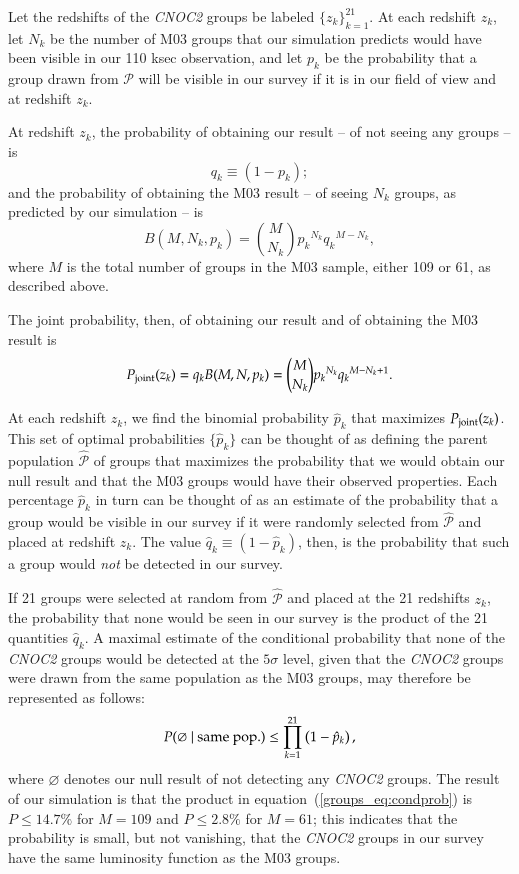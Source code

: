 Let the redshifts of the \textsl{CNOC2} groups be labeled $\{z_k\}_{k=1}^{21}$.
At each redshift $z_k$, let $N_k$ be the number of M03 groups that our
simulation predicts would have been visible in our 110 ksec observation, and
let $p_k$ be the probability that a group drawn from $\mathcal{P}$ will be
visible in our survey if it is in our field of view and at redshift $z_k$.

At redshift $z_k$, the probability of obtaining our result -- of not seeing any
groups -- is
\begin{equation}
q_k \equiv (1-p_k);
\label{groups_eq:qk}
\end{equation}
and the probability of obtaining the M03 result -- of seeing $N_k$ groups, as
predicted by our simulation -- is
\begin{equation}
B(M,N_k,p_k) = {M \choose N_k} {p_k}^{N_k} {q_k}^{M-N_k},
\label{groups_eq:M03prob}
\end{equation}
where $M$ is the total number of groups in the M03 sample, either 109 or 61, as
described above.

The joint probability, then, of obtaining our result and of obtaining the M03
result is
\begin{equation}
P_{\rm joint}(z_k) = q_k B(M,N,p_k) = {M \choose N_k} {p_k}^{N_k} {q_k}^{M-N_k+1}.
\label{groups_eq:joint}
\end{equation}

At each redshift $z_k$, we find the binomial probability $\hat{p}_k$ that
maximizes $P_{\rm joint}(z_k)$.  This set of optimal probabilities
$\{ \hat{p}_k \}$ can be thought of as defining the parent population
$\widehat{\mathcal{P}}$ of groups that maximizes the probability that we would
obtain our null result and that the M03 groups would have their observed
properties.  Each percentage $\hat{p}_k$ in turn can be thought of as an
estimate of the probability that a group would be visible in our survey if it
were randomly selected from $\widehat{\mathcal{P}}$ and placed at redshift
$z_k$.  The value $\hat{q}_k \equiv (1-\hat{p}_k)$, then, is the
probability that such a group would {\it not} be detected in our survey.

If 21 groups were selected at random from $\widehat{\mathcal{P}}$ and placed at
the 21 redshifts $z_k$,
the probability that none would be seen in our survey is the product
of the 21 quantities $\hat{q}_k$.  A maximal estimate of the conditional
probability that none of the \textsl{CNOC2} groups would be detected at the
$5\sigma$ level, given that the \textsl{CNOC2} groups were drawn from the same
population as the M03 groups, may therefore be represented as follows:
\begin{equation}
P(\varnothing ~| {\rm ~same ~pop.}) \leq \prod_{k=1}^{21} \left( 1-\hat{p}_k \right),
\label{groups_eq:condprob}
\end{equation}
where $\varnothing$ denotes our null result of not detecting any
\textsl{CNOC2} groups.  The result of our simulation is that the
product in equation~(\ref{groups_eq:condprob}) is $P \leq 14.7\%$ for
$M=109$ and $P \leq 2.8\%$ for $M=61$; this indicates that the
probability is small, but not vanishing, that the \textsl{CNOC2}
groups in our survey have the same luminosity function as the M03
groups.

